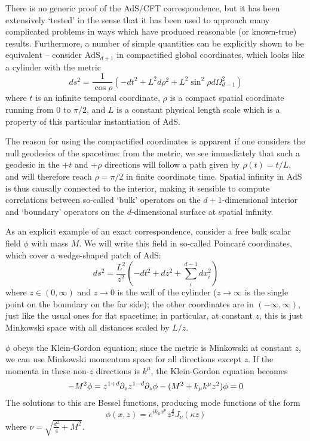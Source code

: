 There is no generic proof of the AdS/CFT correspondence, but it has been 
extensively `tested' in the sense that it has been used to approach many 
complicated problems in ways which have produced reasonable (or known-true) 
results\cite{Polchinski:TASI}. Furthermore, a number of simple quantities can be
explicitly shown to be equivalent -- consider $\mathrm{AdS}_{d+1}$ in 
compactified global coordinates, which looks like a cylinder with the metric
\begin{equation}
    ds^2 = \frac{1}{\cos\rho} \left( -dt^2 + L^2 d\rho^2 + L^2 \sin^2\rho 
                                     d\Omega^2_{d-1} \right)
\end{equation}
where $t$ is an infinite temporal coordinate, $\rho$ is a compact spatial 
coordinate running from $0$ to $\pi/2$, and $L$ is a constant physical length 
scale which is a property of this particular instantiation of AdS.

The reason for using the compactified coordinates is apparent if one considers
the null geodesics of the spacetime: from the metric, we see immediately that 
such a geodesic in the $+t$ and $+\rho$ directions will follow a path given by 
$\rho(t) = t/L$, and will therefore reach $\rho = \pi/2$ in finite coordinate 
time. Spatial infinity in AdS is thus causally connected to the interior, making
it sensible to compute correlations between so-called `bulk' operators on the
$d+1$-dimensional interior and `boundary' operators on the $d$-dimensional 
surface at spatial infinity.

As an explicit example of an exact correspondence, consider a free bulk scalar 
field $\phi$ with mass $M$. We will write this field in so-called Poincar\'e
coordinates, which cover a wedge-shaped patch of AdS:
\begin{equation}
    ds^2 = \frac{L^2}{z^2} \left( -dt^2 + dz^2 + \sum_i^{d-1} dx_i^2 \right)
\end{equation}
where $z \in (0, \infty)$ and $z \to 0$ is the wall of the cylinder 
($z \to \infty$ is the single point on the boundary on the far side); the other
coordinates are in $(-\infty, \infty)$, just like the usual ones for flat 
spacetime; in particular, at constant $z$, this is just Minkowski space with all
distances scaled by $L/z$.

$\phi$ obeys the Klein-Gordon equation; since the metric is Minkowski at 
constant $z$, we can use Minkowski momentum space for all directions except $z$.
If the momenta in these non-$z$ directions is $k^\mu$, the Klein-Gordon equation
becomes
\begin{equation}
    \box \phi - M^2 \phi = z^{1+d} \partial_z z^{1-d} \partial_z \phi 
                         - (M^2 + k_\mu k^\mu z^2) \phi = 0
\end{equation}
The solutions to this are Bessel functions, producing mode functions of the form
\begin{equation}
    \phi(x, z) = e^{i k_\mu x^\mu} z^\frac{d}{2} J_\nu (\kappa z)
\end{equation}
where $\nu = \sqrt{\frac{d^2}{4} + M^2}$.

